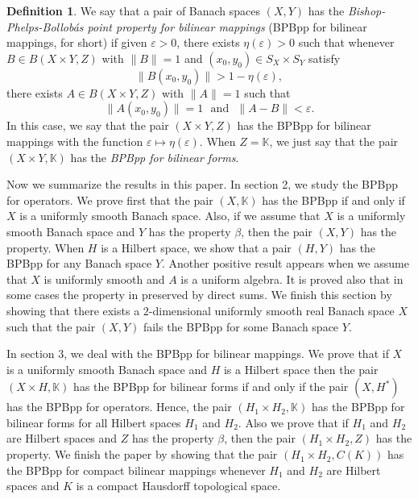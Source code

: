 \documentclass[12pt,a4paper]{amsart}
\theoremstyle{definition}
\newtheorem{definition}[theorem]{Definition}
\newcommand{\e}{\varepsilon}
\numberwithin{equation}{section}
\newcommand{\K}{\mathbb{K}} %
\def\K{{\mathbb K}}
\begin{document}
\begin{definition} We say that a pair of Banach spaces $(X, Y)$ has the {\it Bishop-Phelps-Bollob\'as point property for bilinear mappings} (BPBpp for bilinear mappings, for short) if given $\e > 0$, there exists $\eta(\e) > 0$ such that whenever $B \in B(X \times Y, Z)$ with $\|B\| = 1$ and $(x_0, y_0) \in S_X \times S_Y$ satisfy
	\begin{equation*}
	\|B(x_0, y_0)\| > 1 - \eta(\e),
	\end{equation*}
there exists $A \in B(X \times Y, Z)$ with $\|A\| = 1$ such that
\begin{equation*}
\|A(x_0, y_0)\| = 1 \ \ \ \mbox{and} \ \ \ \|A - B\| < \e.
\end{equation*}
In this case, we say that the pair $(X \times Y, Z)$ has the BPBpp for bilinear mappings with the function $\e \longmapsto \eta(\e)$. When $Z = \K$, we just say that the pair $(X \times Y, \K)$ has the {\it BPBpp for bilinear forms}.
\label{sBPBpbilinear}
\end{definition}
Now we summarize the results in this paper. In section 2, we study the BPBpp for operators. We prove first that the pair $(X, \K)$ has the BPBpp if and only if $X$ is a uniformly smooth Banach space. Also, if we assume that $X$ is a uniformly smooth Banach space and $Y$ has the property $\beta$, then the pair $(X, Y)$ has the property. When $H$ is a Hilbert space,  we show that a pair $(H, Y)$ has the BPBpp for any Banach space $Y$. Another positive result appears when we assume that $X$ is uniformly smooth and $A$ is a uniform algebra. It is proved also that in some cases the property in preserved by direct sums. We finish this section by showing that there exists a $2$-dimensional uniformly smooth real Banach space $X$ such that the pair $(X, Y)$ fails the BPBpp for some Banach space $Y$.
 

In section 3, we deal with the BPBpp for bilinear mappings. We prove that if $X$ is a uniformly smooth Banach space and $H$ is a Hilbert space then the pair $(X \times H, \K)$ has the BPBpp for bilinear forms if and only if the pair $(X, H^*)$ has the BPBpp for operators. Hence, the pair $(H_1 \times H_2, \K)$ has the BPBpp for bilinear forms for all Hilbert spaces $H_1$ and $H_2$. Also we prove that if $H_1$ and $H_2$ are Hilbert spaces and $Z$ has the property $\beta$, then the pair $(H_1 \times H_2, Z)$ has the property. We finish the paper by showing that the pair $(H_1 \times H_2, C(K))$ has the BPBpp for compact bilinear mappings whenever $H_1$ and $H_2$ are Hilbert spaces and $K$ is a compact Hausdorff topological space. 
\end{document}
